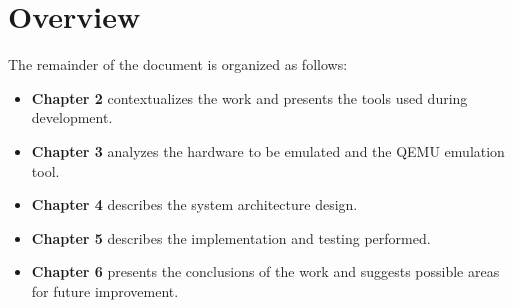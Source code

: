 \section{Overview}
\label{chap:Overview}

The remainder of the document is organized as follows:

\begin{itemize}
    \item \textbf{Chapter 2} contextualizes the work and presents the tools used during development.
    \item \textbf{Chapter 3} analyzes the hardware to be emulated and the QEMU emulation tool.
    \item \textbf{Chapter 4} describes the system architecture design.
    \item \textbf{Chapter 5} describes the implementation and testing performed.
    \item \textbf{Chapter 6} presents the conclusions of the work and suggests possible areas for future improvement.
\end{itemize}

